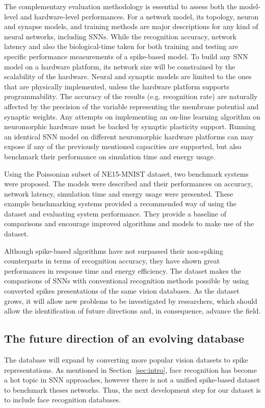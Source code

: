The complementary evaluation methodology is essential to assess both the model-level and hardware-level performances.
For a network model, its topology, neuron and synapse models, and training methods are major descriptions for any kind of neural networks, including SNNs.
While the recognition accuracy, network latency and also the biological-time taken for both training and testing are specific performance measurements of a spike-based model.
To build any SNN model on a hardware platform, its network size will be constrained by the scalability of the hardware. Neural and synaptic models are limited to the ones that are physically implemented, unless the hardware platform supports programmability.
The accuracy of the results (e.g. recognition rate) are naturally affected by the precision of the variable representing the membrane potential and synaptic weights.
Any attempts on implementing an on-line learning algorithm on neuromorphic hardware must be backed by synaptic plasticity support.
Running an identical SNN model on  different neuromorphic hardware platforms can may expose if any of the previously mentioned capacities are supported, but also benchmark their performance on simulation time and energy usage.


Using the Poissonian subset of NE15-MNIST dataset, two benchmark systems were proposed. 
The models were described and their performances on accuracy, network latency, simulation time and energy usage were presented.
These example benchmarking systems provided a recommended way of using the dataset and evaluating system performance.
They provide a baseline of comparisons and encourage improved algorithms and models to make use of the dataset. 

Although spike-based algorithms have not surpassed their non-spiking counterparts in terms of recognition accuracy, they have shown great performances in response time and energy efficiency.
The dataset makes the comparisons of SNNs with conventional recognition methods possible by using converted spikes presentations of the same vision databases.
As the dataset grows, it will allow new problems to be investigated by researchers, which should allow the identification of future directions and, in consequence, advance the field.

\subsection{The future direction of an evolving database}
The database will expand by converting more popular vision datasets to spike representations.
As mentioned in Section~\ref{sec:intro}, face recognition has become a hot topic in SNN approaches, however there is not a unified spike-based dataset to benchmark theses networks.
Thus, the next development step for our dataset is to include face recognition databases.

